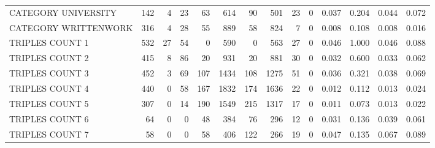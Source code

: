 \begin{tabular}{lrrrrrrrrrllll}
 CATEGORY UNIVERSITY      &             142 &             4 &              23 &              63 &             614 &   90 &  501 &   23 &    0 & 0.037 & 0.204 & 0.044 & 0.072 \\
 CATEGORY WRITTENWORK     &             316 &             4 &              28 &              55 &             889 &   58 &  824 &    7 &    0 & 0.008 & 0.108 & 0.008 & 0.016 \\
 TRIPLES COUNT 1          &             532 &            27 &              54 &               0 &             590 &    0 &  563 &   27 &    0 & 0.046 & 1.000 & 0.046 & 0.088 \\
 TRIPLES COUNT 2          &             415 &             8 &              86 &              20 &             931 &   20 &  881 &   30 &    0 & 0.032 & 0.600 & 0.033 & 0.062 \\
 TRIPLES COUNT 3          &             452 &             3 &              69 &             107 &            1434 &  108 & 1275 &   51 &    0 & 0.036 & 0.321 & 0.038 & 0.069 \\
 TRIPLES COUNT 4          &             440 &             0 &              58 &             167 &            1832 &  174 & 1636 &   22 &    0 & 0.012 & 0.112 & 0.013 & 0.024 \\
 TRIPLES COUNT 5          &             307 &             0 &              14 &             190 &            1549 &  215 & 1317 &   17 &    0 & 0.011 & 0.073 & 0.013 & 0.022 \\
 TRIPLES COUNT 6          &              64 &             0 &               0 &              48 &             384 &   76 &  296 &   12 &    0 & 0.031 & 0.136 & 0.039 & 0.061 \\
 TRIPLES COUNT 7          &              58 &             0 &               0 &              58 &             406 &  122 &  266 &   19 &    0 & 0.047 & 0.135 & 0.067 & 0.089 \\
\hline
\end{tabular}